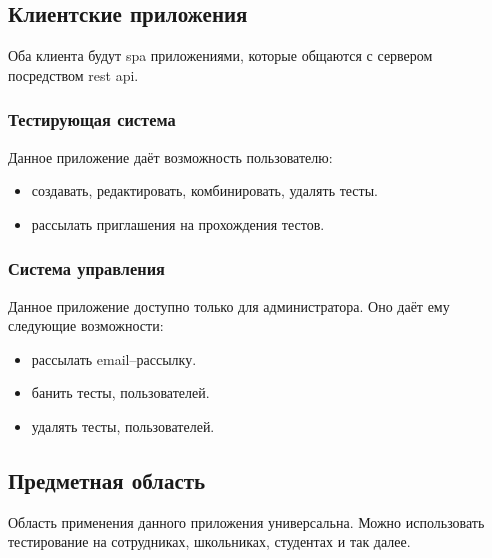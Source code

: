 \subsection{Клиентские приложения}
Оба клиента будут \acrshort{spa} приложениями, которые общаются с сервером посредством \acrshort{rest} \acrshort{api}.

\subsubsection{Тестирующая система}
Данное приложение даёт возможность пользователю:
\begin{itemize}
    \item создавать, редактировать, комбинировать, удалять тесты.
    \item рассылать приглашения на прохождения тестов.
\end{itemize}

\subsubsection{Система управления}
Данное приложение доступно только для администратора. Оно даёт ему следующие возможности:
\begin{itemize}
    \item рассылать email--рассылку.
    \item банить тесты, пользователей.
    \item удалять тесты, пользователей.
\end{itemize}

\subsection{Предметная область}
Область применения данного приложения универсальна. Можно использовать тестирование на сотрудниках, школьниках, студентах и так далее.

